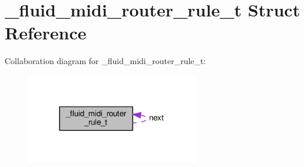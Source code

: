 \hypertarget{struct__fluid__midi__router__rule__t}{}\section{\+\_\+fluid\+\_\+midi\+\_\+router\+\_\+rule\+\_\+t Struct Reference}
\label{struct__fluid__midi__router__rule__t}


Collaboration diagram for \+\_\+fluid\+\_\+midi\+\_\+router\+\_\+rule\+\_\+t\+:
\nopagebreak
\begin{figure}[H]
\begin{center}
\leavevmode
\includegraphics[width=213pt]{struct__fluid__midi__router__rule__t__coll__graph}
\end{center}
\end{figure}
